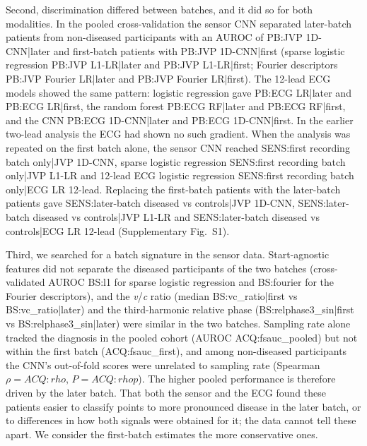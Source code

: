 \documentclass[11pt]{article}
\begin{document}
Second, discrimination differed between batches, and it did so for both modalities. In the pooled cross-validation the sensor CNN separated later-batch patients from non-diseased participants with an AUROC of {{PB:JVP 1D-CNN|later}} and first-batch patients with {{PB:JVP 1D-CNN|first}} (sparse logistic regression {{PB:JVP L1-LR|later}} and {{PB:JVP L1-LR|first}}; Fourier descriptors {{PB:JVP Fourier LR|later}} and {{PB:JVP Fourier LR|first}}). The 12-lead ECG models showed the same pattern: logistic regression gave {{PB:ECG LR|later}} and {{PB:ECG LR|first}}, the random forest {{PB:ECG RF|later}} and {{PB:ECG RF|first}}, and the CNN {{PB:ECG 1D-CNN|later}} and {{PB:ECG 1D-CNN|first}}. In the earlier two-lead analysis the ECG had shown no such gradient. When the analysis was repeated on the first batch alone, the sensor CNN reached {{SENS:first recording batch only|JVP 1D-CNN}}, sparse logistic regression {{SENS:first recording batch only|JVP L1-LR}} and 12-lead ECG logistic regression {{SENS:first recording batch only|ECG LR 12-lead}}. Replacing the first-batch patients with the later-batch patients gave {{SENS:later-batch diseased vs controls|JVP 1D-CNN}}, {{SENS:later-batch diseased vs controls|JVP L1-LR}} and {{SENS:later-batch diseased vs controls|ECG LR 12-lead}} (Supplementary Fig.~S1).

Third, we searched for a batch signature in the sensor data. Start-agnostic features did not separate the diseased participants of the two batches (cross-validated AUROC {{BS:l1}} for sparse logistic regression and {{BS:fourier}} for the Fourier descriptors), and the \textit{v}/\textit{c} ratio (median {{BS:vc_ratio|first}} vs {{BS:vc_ratio|later}}) and the third-harmonic relative phase ({{BS:relphase3_sin|first}} vs {{BS:relphase3_sin|later}}) were similar in the two batches. Sampling rate alone tracked the diagnosis in the pooled cohort (AUROC {{ACQ:fsauc_pooled}}) but not within the first batch ({{ACQ:fsauc_first}}), and among non-diseased participants the CNN's out-of-fold scores were unrelated to sampling rate (Spearman $\rho={{ACQ:rho}}$, $P={{ACQ:rhop}}$). The higher pooled performance is therefore driven by the later batch. That both the sensor and the ECG found these patients easier to classify points to more pronounced disease in the later batch, or to differences in how both signals were obtained for it; the data cannot tell these apart. We consider the first-batch estimates the more conservative ones.
\end{document}
